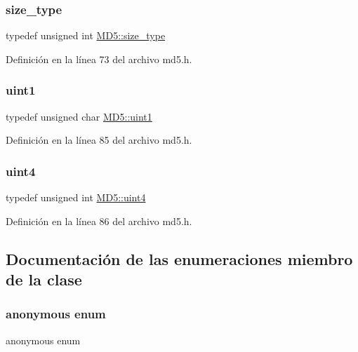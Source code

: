 \subsubsection{\texorpdfstring{size\+\_\+type}{size\_type}}
{\footnotesize\ttfamily typedef unsigned int \hyperlink{classMD5_aa836972700679dbcff6ae8337f6db464}{M\+D5\+::size\+\_\+type}}



Definición en la línea 73 del archivo md5.\+h.

\hypertarget{classMD5_a3b1c4901139aef256ee49c4ab14d09f9}{}\label{classMD5_a3b1c4901139aef256ee49c4ab14d09f9} 
\subsubsection{\texorpdfstring{uint1}{uint1}}
{\footnotesize\ttfamily typedef unsigned char \hyperlink{classMD5_a3b1c4901139aef256ee49c4ab14d09f9}{M\+D5\+::uint1}\hspace{0.3cm}{\ttfamily [private]}}



Definición en la línea 85 del archivo md5.\+h.

\hypertarget{classMD5_a2e5b84a3d7db292f49873061214a0444}{}\label{classMD5_a2e5b84a3d7db292f49873061214a0444} 
\subsubsection{\texorpdfstring{uint4}{uint4}}
{\footnotesize\ttfamily typedef unsigned int \hyperlink{classMD5_a2e5b84a3d7db292f49873061214a0444}{M\+D5\+::uint4}\hspace{0.3cm}{\ttfamily [private]}}



Definición en la línea 86 del archivo md5.\+h.



\subsection{Documentación de las enumeraciones miembro de la clase}
\hypertarget{classMD5_a227e6f16f2409956b516b453e6bc7429}{}\label{classMD5_a227e6f16f2409956b516b453e6bc7429} 
\subsubsection{\texorpdfstring{anonymous enum}{anonymous enum}}
{\footnotesize\ttfamily anonymous enum\hspace{0.3cm}{\ttfamily [private]}}

